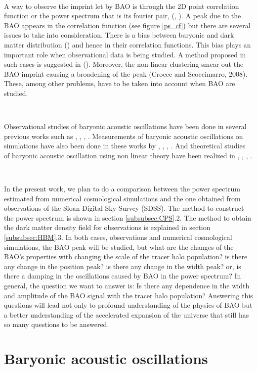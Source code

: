 \	

A way to observe the imprint let by BAO is through the 2D point correlation function or the power spectrum that is 
its fourier pair, (\cite{PLOT}, \cite{PLOT2}).  A peak due to the BAO appears in the correlation function (see figure \ref{ps_cf}) but there are 
several issues to take into consideration.
There is a bias between baryonic and dark matter distribution (\cite{Biases}) and hence in their correlation functions. This bias  
plays an important role when observational data 
is being studied. A method proposed in such cases is suggested in (\cite{HBM}). 
Moreover, the non-linear clustering smear out the BAO imprint causing a broadening of the peak (Crocce
and Scoccimarro, 2008). These, among other 
problems, have to be taken into account when BAO are studied. 

\

Observational studies of baryonic acoustic oscillations have been done in several previous works such 
as \cite{Obs01}, \cite{Obs02}, \cite{Obs03}, \cite{Obs04} . Measurements of baryonic acoustic oscillations on simulations 
have also been done in these works by \cite{Sim01}, \cite{Sim02}, \cite{Sim03}, \cite{Sim04}.
And theoretical studies of baryonic acoustic oscillation using non linear theory have been realized in \cite{Theo01}, \cite{Theo02},
\cite{Theo03}, \cite{last} .  

\

In the present work, we plan to do a comparison between the power spectrum estimated from numerical cosmological simulations
and the one obtained from observations of the Sloan Digital Sky Survey (SDSS). The method to construct the power spectrum
is shown in section \ref{subsubsec:CPS}.2. The method to obtain the dark matter density field for observations is 
explained in section \ref{subsubsec:HBM}.3. In both cases, observations and numerical cosmological simulations, the BAO 
peak will be studied, but what are the changes of the BAO's properties with changing the scale of the tracer halo population?
is there any change in the position peak? is there any change in the width peak? or, is there a damping in the oscillations
caused by BAO in the power spectrum? In general, the question we want to answer is: Is there any dependence in the width 
and amplitude of the BAO signal with the tracer halo population?
Answering this questions will lead not only to profound understanding of the physics of
BAO but a better understanding of the accelerated expansion of the universe that still has so many questions to be answered. 


\section{ Baryonic acoustic oscillations } 




